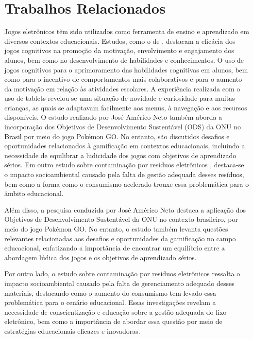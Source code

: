\chapter{Trabalhos Relacionados}
\label{trabalhos relacionados}

\par
Jogos eletrônicos têm sido utilizados como ferramenta de ensino e aprendizado em diversos contextos educacionais. Estudos, como o de \cite{gameUseOnSchool}, destacam a eficácia dos jogos cognitivos na promoção da motivação, envolvimento e engajamento dos alunos, bem como no desenvolvimento de habilidades e conhecimentos. O uso de jogos cognitivos para o aprimoramento das habilidades cognitivas em alunos, bem como para o incentivo de comportamentos mais colaborativos e para o aumento da motivação em relação às atividades escolares. A experiência realizada com o uso de tablets revelou-se uma situação de novidade e curiosidade para muitas crianças, as quais se adaptavam facilmente aos menus, à navegação e aos recursos disponíveis. O estudo realizado por José Américo Neto \cite{joseamericonetoGameOds} também aborda a incorporação dos Objetivos de Desenvolvimento Sustentável (ODS) da ONU \cite{odsbrasil} no Brasil por meio do jogo Pokémon GO. No entanto, são discutidos desafios e oportunidades relacionados à gamificação em contextos educacionais, incluindo a necessidade de equilibrar a ludicidade dos jogos com objetivos de aprendizado sérios. Em outro estudo sobre contaminação por resíduos eletrônicos \cite{eWasteContamination}, destaca-se o impacto socioambiental causado pela falta de gestão adequada desses resíduos, bem como a forma como o consumismo acelerado trouxe essa problemática para o âmbito educacional.

Além disso, a pesquisa conduzida por José Américo Neto destaca a aplicação dos Objetivos de Desenvolvimento Sustentável da ONU no contexto brasileiro, por meio do jogo Pokémon GO. No entanto, o estudo também levanta questões relevantes relacionadas aos desafios e oportunidades da gamificação no campo educacional, enfatizando a importância de encontrar um equilíbrio entre a abordagem lúdica dos jogos e os objetivos de aprendizado sérios.

Por outro lado, o estudo sobre contaminação por resíduos eletrônicos ressalta o impacto socioambiental causado pela falta de gerenciamento adequado desses materiais, destacando como o aumento do consumismo tem levado essa problemática para o cenário educacional. Essas investigações revelam a necessidade de conscientização e educação sobre a gestão adequada do lixo eletrônico, bem como a importância de abordar essa questão por meio de estratégias educacionais eficazes e inovadoras.

